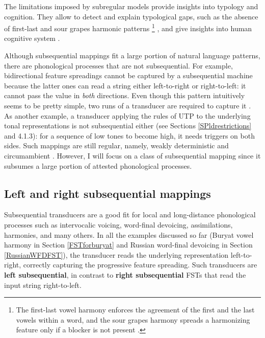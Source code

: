 The limitations imposed by subregular models provide insights into typology and cognition.
They allow to detect and explain typological gaps, such as the absence of first-last and sour grapes harmonic patterns%
\footnote{The first-last vowel harmony enforces the agreement of the first and the last vowels within a word, and the sour grapes harmony spreads a harmonizing feature only if a blocker is not present \citep{Heinz-Lai-2013-VHS}.}
 \citep{Heinz-Lai-2013-VHS,Luo2017}, and give insights into human cognitive system \citep{RogersPullum2011,Lai15,Avcu2017Experiment}.


Although subsequential mappings fit a large portion of natural language patterns, there are phonological processes that are not subsequential.
For example, bidirectional feature spreadings cannot be captured by a subsequential machine because the latter ones can read a string either left-to-right or right-to-left: it cannot pass the value in \emph{both} directions.
Even though this pattern intuitively seems to be pretty simple, two runs of a transducer are required to capture it \citep{Heinz-Lai-2013-VHS}.
As another example, a transducer applying the rules of UTP to the underlying tonal representations is not subsequential either (see Sections \ref{SPldrestrictions} and 4.1.3): for a sequence of low tones to become high, it needs triggers on both sides.
Such mappings are still regular, namely, weakly deterministic and circumambient \citep{Heinz-Lai-2013-VHS,Jardine2016,LamontEtAl2019}.
However, I will focus on a class of subsequential mapping since it subsumes a large portion of attested phonological processes.





\subsection{Left and right subsequential mappings}


Subsequential transducers are a good fit for local and long-distance phonological processes such as intervocalic voicing, word-final devoicing, assimilations, harmonies, and many others.
In all the examples discussed so far (Buryat vowel harmony in Section \ref{FSTforburyat} and Russian word-final devoicing in Section \ref{RussianWFDFST}), the transducer reads the underlying representation left-to-right, correctly capturing the progressive feature spreading.
Such transducers are \textbf{left subsequential}, in contrast to \textbf{right subsequential} FSTs that read the input string right-to-left.

